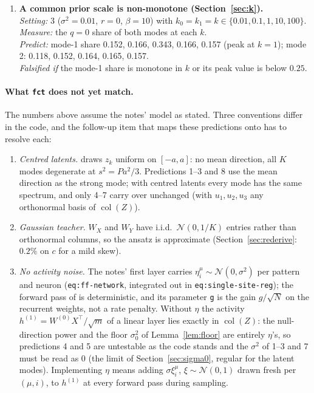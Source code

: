 \documentclass[11pt,a4paper]{article}
\newcommand{\col}{\operatorname{col}}
\theoremstyle{remark}
\begin{document}
\begin{enumerate}[leftmargin=2em,itemsep=4pt]
  \item \textbf{A common prior scale is non-monotone (Section~\ref{sec:k}).}\\
  \emph{Setting:} 3 ($\sigma^2 = 0.01$, $r = 0$, $\beta = 10$) with $k_0 = k_1 = k\in\{0.01, 0.1, 1, 10, 100\}$.\\
  \emph{Measure:} the $q = 0$ share of both modes at each $k$.\\
  \emph{Predict:} mode-1 share 0.152, 0.166, 0.343, 0.166, 0.157 (peak at $k = 1$); mode 2: 0.118, 0.152, 0.164, 0.165, 0.157.\\
  \emph{Falsified if} the mode-1 share is monotone in $k$ or its peak value is below $0.25$.
\end{enumerate}

\paragraph{What \texttt{fct} does not yet match.}
The numbers above assume the notes' model as stated. Three conventions differ in the  code, and the follow-up item that maps these predictions onto  has to resolve each:
\begin{enumerate}[nosep]
  \item \emph{Centred latents.}  draws $z_k$ uniform on $[-a,a]$: no mean direction, all $K$ modes degenerate at $s^2 = Pa^2/3$. Predictions 1--3 and 8 use the mean direction as the strong mode; with centred latents every mode has the same spectrum, and only 4--7 carry over unchanged (with $u_1,u_2,u_3$ any orthonormal basis of $\col(Z)$).
  \item \emph{Gaussian teacher.} $W_X$ and $W_Y$ have i.i.d.\ $\mathcal N(0,1/K)$ entries rather than orthonormal columns, so the ansatz is approximate (Section~\ref{sec:rederive}: $0.2\%$ on $c$ for a mild skew).
  \item \emph{No activity noise.} The notes' first layer carries $\eta^\mu_i\sim\mathcal N(0,\sigma^2)$ per pattern and neuron (\texttt{eq:ff-network}, integrated out in \texttt{eq:single-site-reg}); the forward pass of  is deterministic, and its parameter \texttt{g} is the gain $g/\sqrt N$ on the recurrent weights, not a rate penalty. Without $\eta$ the activity $h^{(1)} = W^{(0)}X^\top/\sqrt m$ of a linear layer lies exactly in $\col(Z)$: the null-direction power and the floor $\sigma_0^2$ of Lemma~\ref{lem:floor} are entirely $\eta$'s, so predictions 4 and 5 are untestable as the code stands and the $\sigma^2$ of 1--3 and 7 must be read as $0$ (the limit of Section~\ref{sec:sigma0}, regular for the latent modes). Implementing $\eta$ means adding $\sigma\xi^\mu_i$, $\xi\sim\mathcal N(0,1)$ drawn fresh per $(\mu,i)$, to $h^{(1)}$ at every forward pass during sampling.
\end{enumerate}
\end{document}
